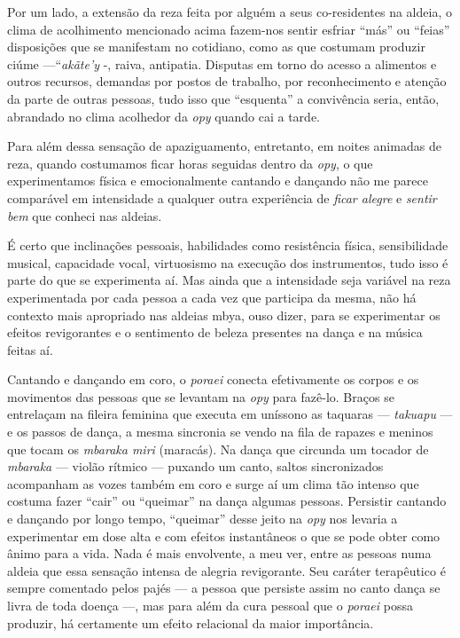 Por um lado, a extensão da reza feita por alguém a seus co-residentes na
aldeia, o clima de acolhimento mencionado acima fazem-nos sentir esfriar
``más'' ou ``feias'' disposições que se manifestam no cotidiano, como as
que costumam produzir ciúme ---``\emph{akãte'y} -, raiva, antipatia.
Disputas em torno do acesso a alimentos e outros recursos, demandas por
postos de trabalho, por reconhecimento e atenção da parte de outras
pessoas, tudo isso que ``esquenta'' a convivência seria, então,
abrandado no clima acolhedor da \emph{opy} quando cai a tarde.

Para além dessa sensação de apaziguamento, entretanto, em noites
animadas de reza, quando costumamos ficar horas seguidas dentro da
\emph{opy}, o que experimentamos física e emocionalmente cantando e
dançando não me parece comparável em intensidade a qualquer outra
experiência de \emph{ficar alegre} e \emph{sentir bem} que conheci nas
aldeias.

É certo que inclinações pessoais, habilidades como resistência física,
sensibilidade musical, capacidade vocal, virtuosismo na execução dos
instrumentos, tudo isso é parte do que se experimenta aí. Mas ainda que
a intensidade seja variável na reza experimentada por cada pessoa a cada
vez que participa da mesma, não há contexto mais apropriado nas aldeias
mbya, ouso dizer, para se experimentar os efeitos revigorantes e o
sentimento de beleza presentes na dança e na música feitas aí.

Cantando e dançando em coro, o \emph{poraei} conecta efetivamente os
corpos e os movimentos das pessoas que se levantam na \emph{opy} para
fazê-lo. Braços se entrelaçam na fileira feminina que executa em
uníssono as taquaras --- \emph{takuapu} --- e os passos de dança, a
mesma sincronia se vendo na fila de rapazes e meninos que tocam os
\emph{mbaraka miri} (maracás). Na dança que circunda um tocador de
\emph{mbaraka} --- violão rítmico --- puxando um canto, saltos
sincronizados acompanham as vozes também em coro e surge aí um clima tão
intenso que costuma fazer ``cair'' ou ``queimar'' na dança algumas
pessoas. Persistir cantando e dançando por longo tempo, ``queimar''
desse jeito na \emph{opy} nos levaria a experimentar em dose alta e com
efeitos instantâneos o que se pode obter como ânimo para a vida. Nada é
mais envolvente, a meu ver, entre as pessoas numa aldeia que essa
sensação intensa de alegria revigorante. Seu caráter terapêutico é
sempre comentado pelos pajés --- a pessoa que persiste assim no canto
dança se livra de toda doença ---, mas para além da cura pessoal que o
\emph{poraei} possa produzir, há certamente um efeito relacional da
maior importância.

